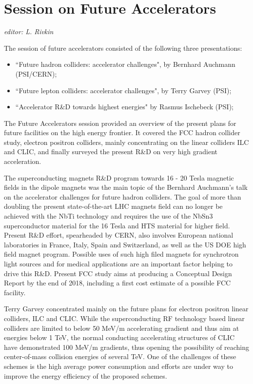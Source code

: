 \section{Session on Future Accelerators}\label{futureacc}{\it editor: L. Rivkin}

\noindent The session of future accelerators consisted of the following three presentations:
\begin{itemize} \setlength{\itemsep}{-1ex}
\item ``Future hadron colliders: accelerator challenges",  by  Bernhard Auchmann  (PSI/CERN); 
\item ``Future lepton colliders: accelerator challenges",  by Terry Garvey   (PSI); 
\item ``Accelerator R\&D towards highest energies" by Rasmus Ischebeck (PSI);  
\end{itemize}





\noindent The Future Accelerators session provided an overview of the present
plans for future facilities on the high energy frontier. It covered
the FCC hadron collider study, electron positron colliders, mainly
concentrating on the linear colliders ILC and CLIC, and finally
surveyed the present R\&D on very high gradient acceleration.
\medskip

\noindent The superconducting magnets R\&D program towards 16 - 20 Tesla magnetic
fields in the dipole magnets was the main topic of the Bernhard
Auchmann’s talk on the accelerator challenges for future hadron
colliders. The goal of more than doubling the present state-of-the-art
LHC magnets field can no longer be achieved with the NbTi technology
and requires the use of the NbSn3 superconductor material for the 16
Tesla and HTS material for higher field. Present R\&D effort,
spearheaded by CERN, also involves European national laboratories in
France, Italy, Spain and Switzerland, as well as the US DOE high field
magnet program. Possible uses of such high filed magnets for
synchrotron light sources and for medical applications are an
important factor helping to drive this R\&D. Present FCC study aims at
producing a Conceptual Design Report by the end of 2018, including a
first cost estimate of a possible FCC facility.
\medskip 

\noindent Terry Garvey concentrated mainly on the future plans for electron
positron linear colliders, ILC and CLIC. While the superconducting RF
technology based linear colliders are limited to below 50 MeV/m
accelerating gradient and thus aim at energies below 1 TeV, the normal
conducting accelerating structures of CLIC have demonstrated 100 MeV/m
gradients, thus opening the possibility of reaching center-of-mass
collision energies of several TeV. One of the challenges of these
schemes is the high average power consumption and efforts are under
way to improve the energy efficiency of the proposed schemes.
\medskip

